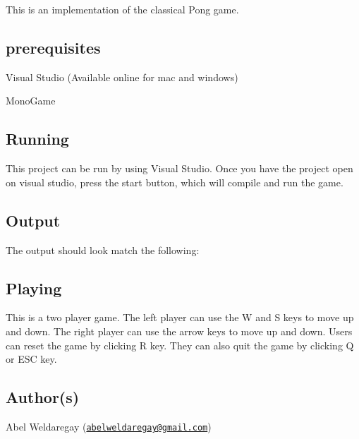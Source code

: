 This is an implementation of the classical Pong game.

\subsection*{prerequisites}


\begin{DoxyItemize}
\item Visual Studio (Available online for mac and windows)
\item Mono\-Game
\end{DoxyItemize}

\subsection*{Running}

This project can be run by using Visual Studio. Once you have the project open on visual studio, press the start button, which will compile and run the game.

\subsection*{Output}

The output should look match the following\-:



\subsection*{Playing}

This is a two player game. The left player can use the {\ttfamily W} and {\ttfamily S} keys to move up and down. The right player can use the arrow keys to move up and down. Users can reset the game by clicking {\ttfamily R} key. They can also quit the game by clicking {\ttfamily Q} or {\ttfamily E\-S\-C} key.

\subsection*{Author(s)}


\begin{DoxyItemize}
\item Abel Weldaregay (\href{mailto:abelweldaregay@gmail.com}{\tt abelweldaregay@gmail.\-com}) 
\end{DoxyItemize}